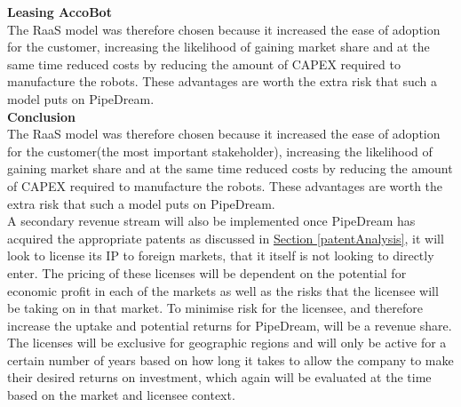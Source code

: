 \documentclass[11pt]{article}		%
\newcommand{\sectref}[1]{\hyperref[#1]{Section \ref*{#1}}}     %
\begin{document}
            \textbf{Leasing AccoBot}
            \\
            The RaaS model was therefore chosen because it increased the ease of adoption for the customer, increasing the likelihood of gaining market share and at the same time reduced costs by reducing the amount of CAPEX required to manufacture the robots. These advantages are worth the extra risk that such a model puts on PipeDream.
            \\
            \textbf{Conclusion}
            \\
           The RaaS model was therefore chosen because it increased the ease of adoption for the customer(the most important stakeholder), increasing the likelihood of gaining market share and at the same time reduced costs by reducing the amount of CAPEX required to manufacture the robots. These advantages are worth the extra risk that such a model puts on PipeDream.
           \\
           A secondary revenue stream will also be implemented once PipeDream has acquired the appropriate patents as discussed in \sectref{patentAnalysis}, it will look to license its IP to foreign markets, that it itself is not looking to directly enter. The pricing of these licenses will be dependent on the potential for economic profit in each of the markets as well as the risks that the licensee will be taking on in that market. To minimise risk for the licensee, and therefore increase the uptake and potential returns for PipeDream, will be a revenue share. The licenses will be exclusive for geographic regions and will only be active for a certain number of years based on how long it takes to allow the company to make their desired returns on investment, which again will be evaluated at the time based on the market and licensee context.
            
\end{document}
